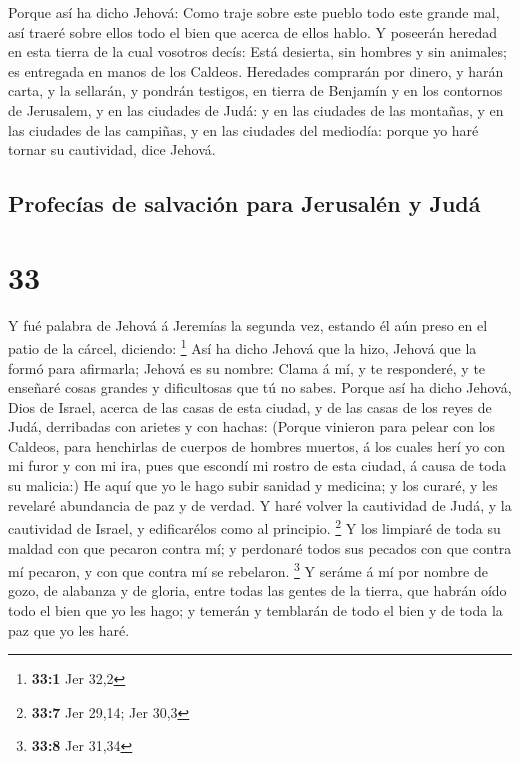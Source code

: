  Porque así ha dicho Jehová: Como traje sobre este pueblo
todo este grande mal, así traeré sobre ellos todo el bien que acerca de
ellos hablo.  Y poseerán heredad en esta tierra de la
cual vosotros decís: Está desierta, sin hombres y sin animales; es
entregada en manos de los Caldeos.  Heredades comprarán
por dinero, y harán carta, y la sellarán, y pondrán testigos, en tierra
de Benjamín y en los contornos de Jerusalem, y en las ciudades de Judá:
y en las ciudades de las montañas, y en las ciudades de las campiñas, y
en las ciudades del mediodía: porque yo haré tornar su cautividad, dice
Jehová.

\hypertarget{profecuxedas-de-salvaciuxf3n-para-jerusaluxe9n-y-juduxe1}{%
\subsection{Profecías de salvación para Jerusalén y
Judá}\label{profecuxedas-de-salvaciuxf3n-para-jerusaluxe9n-y-juduxe1}}

\hypertarget{section-32}{%
\section{33}\label{section-32}}

 Y fué palabra de Jehová á Jeremías la segunda vez,
estando él aún preso en el patio de la cárcel, diciendo: \footnote{\textbf{33:1}
  Jer 32,2}  Así ha dicho Jehová que la hizo, Jehová que
la formó para afirmarla; Jehová es su nombre:  Clama á mí,
y te responderé, y te enseñaré cosas grandes y dificultosas que tú no
sabes.  Porque así ha dicho Jehová, Dios de Israel, acerca
de las casas de esta ciudad, y de las casas de los reyes de Judá,
derribadas con arietes y con hachas:  (Porque vinieron
para pelear con los Caldeos, para henchirlas de cuerpos de hombres
muertos, á los cuales herí yo con mi furor y con mi ira, pues que
escondí mi rostro de esta ciudad, á causa de toda su malicia:)
 He aquí que yo le hago subir sanidad y medicina; y los
curaré, y les revelaré abundancia de paz y de verdad.  Y
haré volver la cautividad de Judá, y la cautividad de Israel, y
edificarélos como al principio. \footnote{\textbf{33:7} Jer 29,14; Jer
  30,3}  Y los limpiaré de toda su maldad con que pecaron
contra mí; y perdonaré todos sus pecados con que contra mí pecaron, y
con que contra mí se rebelaron. \footnote{\textbf{33:8} Jer 31,34}
 Y seráme á mí por nombre de gozo, de alabanza y de
gloria, entre todas las gentes de la tierra, que habrán oído todo el
bien que yo les hago; y temerán y temblarán de todo el bien y de toda la
paz que yo les haré.

